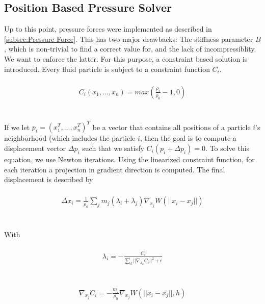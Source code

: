 \documentclass{ACGSeminar}
\begin{document}
\subsection{Position Based Pressure Solver}

Up to this point, pressure forces were implemented as described in \ref{subsec:Pressure Force}. This has two major drawbacks: The stiffness parameter \(B\), which is non-trivial to find a correct value for, and the lack of incompressiblity. We want to enforce the latter.
For this purpose, a constraint based solution is introduced. Every fluid particle is subject to a constraint function \(C_{i}\).\\
\\
\begin{equation} 
\begin{aligned}
C_{i}(x_{1}, ..., x_{n}) = max (\frac{\rho_{i}}{\rho_{0}} - 1, 0)
\end{aligned}
\end{equation}\\
\\

If we let \(p_i = (x^{T}_1, ..., x^{T}_n)^T\) be a vector that contains all positions of a particle \(i\)'s neighborhood (which includes the particle \(i\), then the goal is to compute a displacement vector \(\Delta p_i\) such that we satisfy \(C_i(p_i + \Delta p_i) = 0\).
To solve this equation, we use Newton iterations. Using the linearized constraint function, for each iteration a projection in gradient direction is computed.
The final displacement is described by \\
\\
\begin{equation}
\begin{aligned}
\Delta x_i = \frac{1}{\rho_0} \sum_j m_j(\lambda_i + \lambda_j) \nabla_{x_j}W(||x_i - x_j||)
\end{aligned}
\end{equation}\\
\\

With \\
\\
\begin{equation}
\begin{aligned}
\lambda_{i} = - \frac{C_{i}}{\sum_{k}||\nabla_{x_{k}}C_{i}||^2 + \epsilon}
\end{aligned}
\end{equation}\\
\\
\begin{equation}
\begin{aligned}
\nabla_{x_{j}} C_{i} = - \frac{m_{j}}{\rho_{0}}\nabla_{x_{j}}W(||x_{i} - x_{j}||, h)
\end{aligned}
\end{equation}\\
\\
\end{document}
